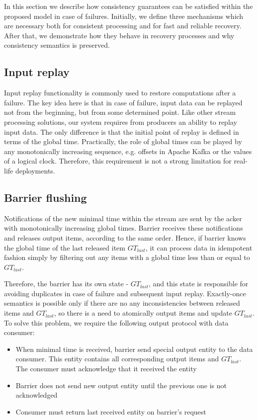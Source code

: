 
\label {fs-consistency-seciton}

In this section we describe how consistency guarantees can be satisfied within the proposed model in case of failures. Initially, we define three mechanisms which are necessary both for consistent processing and for fast and reliable recovery. After that, we demonstrate how they behave in recovery processes and why consistency semantics is preserved.

\subsection{Input replay}
Input replay functionality is commonly used to restore computations after a failure. The key idea here is that in case of failure, input data can be replayed not from the beginning, but from some determined point. Like other stream processing solutions, our system requires from producers an ability to replay input data. The only difference is that the initial point of replay is defined in terms of the global time. Practically, the role of global times can be played by any monotonically increasing sequence, e.g. offsets in Apache Kafka or the values of a logical clock. Therefore, this requirement is not a strong limitation for real-life deployments.

\subsection{Barrier flushing}
Notifications of the new minimal time within the stream are sent by the acker with monotonically increasing global times. Barrier receives these notifications and releases output items, according to the same order. Hence, if barrier knows the global time of the last released item $GT_{last}$, it can process data in idempotent fashion simply by filtering out any items with a global time less than or equal to $GT_{last}$. 

Therefore, the barrier has its own state - $GT_{last}$, and this state is responsible for avoiding duplicates in case of failure and subsequent input replay. Exactly-once semantics is possible only if there are no any inconsistencies between released items and $GT_{last}$, so there is a need to atomically output items and update $GT_{last}$. To solve this problem, we require the following output protocol with data consumer:

\begin{itemize}
    \item When minimal time is received, barrier send special output entity to the data consumer. This entity contains all corresponding output items and $GT_{last}$. The consumer must acknowledge that it received the entity
    \item Barrier does not send new output entity until the previous one is not acknowledged
    \item Consumer must return last received entity on barrier's request 
\end{itemize}

